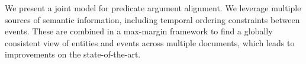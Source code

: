 We present a joint model for predicate argument alignment. We leverage multiple sources of semantic information, including temporal ordering constraints between events. These are combined in a max-margin framework to find a globally consistent view of entities and events across multiple documents, which leads to improvements on the state-of-the-art.
